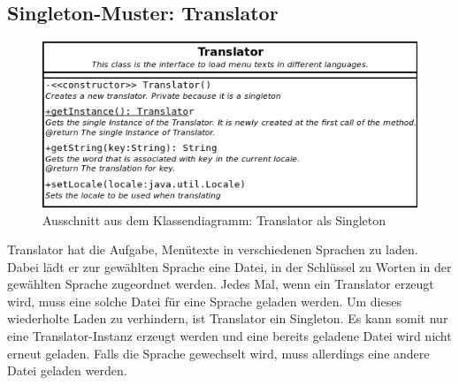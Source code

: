 \documentclass[parskip=full]{scrartcl}
\begin{document}
\subsection{Singleton-Muster: Translator}
\begin{figure}[H]
  \centering
  \includegraphics[scale=0.4]{design/pattern-screenshots/singleton-Translator.png}
  \caption{Ausschnitt aus dem Klassendiagramm: Translator als Singleton}
\end{figure}
Translator hat die Aufgabe, Menütexte in verschiedenen Sprachen zu laden.
Dabei lädt er zur gewählten Sprache eine Datei, in der Schlüssel zu Worten in der gewählten Sprache
zugeordnet werden. Jedes Mal, wenn ein Translator erzeugt wird, muss eine solche Datei
für eine Sprache geladen werden. Um dieses wiederholte Laden zu verhindern, ist Translator ein Singleton.
Es kann somit nur eine Translator-Instanz erzeugt werden und eine bereits geladene Datei
wird nicht erneut geladen. Falls die Sprache gewechselt wird, muss allerdings eine andere Datei geladen werden.

\pagebreak
\end{document}
